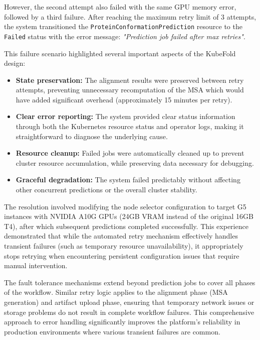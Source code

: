 However, the second attempt also failed with the same GPU memory error, followed by a third failure. After reaching the maximum retry limit of 3 attempts, the system transitioned the \texttt{ProteinConformationPrediction} resource to the \texttt{Failed} status with the error message: \textit{"Prediction job failed after max retries"}.

This failure scenario highlighted several important aspects of the KubeFold design:

\begin{itemize}
    \item \textbf{State preservation:} The alignment results were preserved between retry attempts, preventing unnecessary recomputation of the MSA which would have added significant overhead (approximately 15 minutes per retry).
    
    \item \textbf{Clear error reporting:} The system provided clear status information through both the Kubernetes resource status and operator logs, making it straightforward to diagnose the underlying cause.
    
    \item \textbf{Resource cleanup:} Failed jobs were automatically cleaned up to prevent cluster resource accumulation, while preserving data necessary for debugging.
    
    \item \textbf{Graceful degradation:} The system failed predictably without affecting other concurrent predictions or the overall cluster stability.
\end{itemize}

The resolution involved modifying the node selector configuration to target G5 instances with NVIDIA A10G GPUs (24GB VRAM instead of the original 16GB T4), after which subsequent predictions completed successfully. This experience demonstrated that while the automated retry mechanism effectively handles transient failures (such as temporary resource unavailability), it appropriately stops retrying when encountering persistent configuration issues that require manual intervention.

The fault tolerance mechanisms extend beyond prediction jobs to cover all phases of the workflow. Similar retry logic applies to the alignment phase (MSA generation) and artifact upload phase, ensuring that temporary network issues or storage problems do not result in complete workflow failures. This comprehensive approach to error handling significantly improves the platform's reliability in production environments where various transient failures are common.

